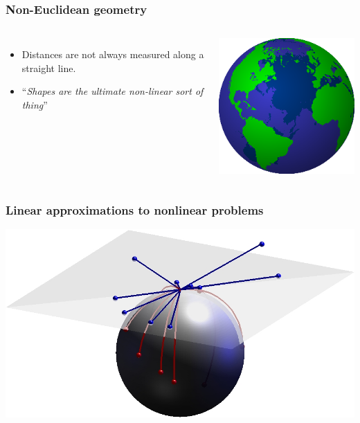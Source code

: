 \begin{frame}
\frametitle{Non-Euclidean geometry}
\begin{columns}[c]
\begin{itemize}
\item Distances are not always measured along a straight line.
\item ``\emph{Shapes are the ultimate non-linear sort of thing}''
\end{itemize}
\includegraphics[width=\textwidth]{Globe}
\end{columns}
\end{frame}

\begin{frame}
\frametitle{Linear approximations to nonlinear problems}
\begin{center}
\includegraphics[width=1.2\textwidth]{spheres}
\end{center}
\end{frame}

